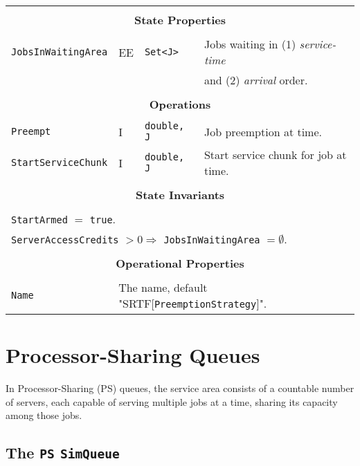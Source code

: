 \documentclass[12pt]{book}
\begin{document}
\begin{tabular}{|l|l|l|l|}
\hline
\multicolumn{4}{|c|}{} \\
\multicolumn{4}{|c|}{\bf State  Properties} \\
\multicolumn{4}{|c|}{} \\
\hline
\lstinline|JobsInWaitingArea| & EE & \lstinline|Set<J>| & Jobs waiting in (1) {\em service-time\/} \\
                              &    &                    & and (2) {\em arrival\/} order. \\
\hline
\multicolumn{4}{|c|}{} \\
\multicolumn{4}{|c|}{\bf Operations} \\
\multicolumn{4}{|c|}{} \\
\hline
\lstinline|Preempt| & I & \lstinline|double, J| & Job preemption at time.\\
\hline
\lstinline|StartServiceChunk| & I & \lstinline|double, J| & Start service chunk for job at time.\\
\hline
\multicolumn{4}{|c|}{} \\
\multicolumn{4}{|c|}{\bf State  Invariants} \\
\multicolumn{4}{|c|}{} \\
\hline
\multicolumn{4}{|l|}{\lstinline|StartArmed| $=$ \lstinline|true|.} \\
\multicolumn{4}{|l|}{\lstinline|ServerAccessCredits| $> 0 \Rightarrow$ \lstinline|JobsInWaitingArea| $= \emptyset$.} \\
\hline
\multicolumn{4}{|c|}{} \\
\multicolumn{4}{|c|}{\bf Operational Properties} \\
\multicolumn{4}{|c|}{} \\
\hline
\lstinline|Name| & \multicolumn{3}{|l|}{The name, default "SRTF[\lstinline|PreemptionStrategy|]".} \\
\hline
\end{tabular}

\section{Processor-Sharing Queues}

In Processor-Sharing (PS) queues,
  the service area consists of a countable number of servers,
  each capable of serving multiple jobs at a time,
  sharing its capacity among those jobs.
  
\subsection{The \lstinline{PS} \lstinline{SimQueue}}
\end{document}
